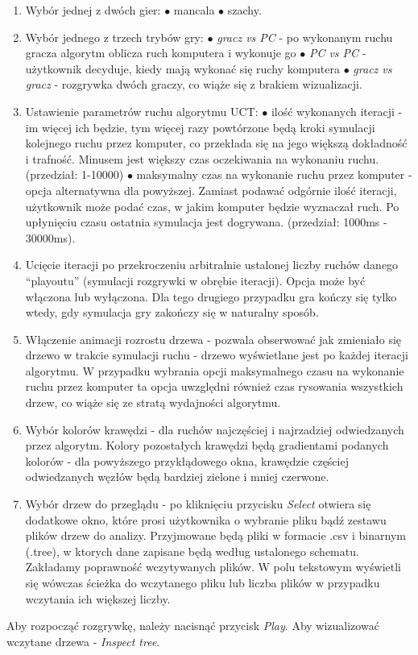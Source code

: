 \documentclass{article}
\begin{document}
\begin{enumerate}
	\item Wybór jednej z dwóch gier:
	\subitem $\bullet$ mancala
	\subitem $\bullet$ szachy.\\
	\item Wybór jednego z trzech trybów gry:
	\subitem $\bullet$ \textit{gracz vs PC} - po wykonanym ruchu gracza algorytm oblicza ruch komputera i wykonuje go
	\subitem $\bullet$ \textit{PC vs PC }- użytkownik decyduje, kiedy mają wykonać się ruchy komputera
	\subitem $\bullet$ \textit{gracz vs gracz} - rozgrywka dwóch graczy, co wiąże się z brakiem wizualizacji.\\
	\item Ustawienie parametrów ruchu algorytmu UCT:
	\subitem $\bullet$ ilość wykonanych iteracji - im więcej ich będzie, tym więcej razy powtórzone będą kroki symulacji kolejnego ruchu przez komputer, co przekłada się na jego większą dokładność i trafność. Minusem jest większy czas oczekiwania na wykonaniu ruchu. (przedział: 1-10000)
	\subitem $\bullet$ maksymalny czas na wykonanie ruchu przez komputer - opcja alternatywna dla powyższej. Zamiast podawać odgórnie ilość iteracji, użytkownik może podać czas, w jakim komputer będzie wyznaczał ruch. Po upłynięciu czasu ostatnia symulacja jest dogrywana. (przedział: 1000ms - 30000ms).\\
	\item Ucięcie iteracji po przekroczeniu arbitralnie ustalonej liczby ruchów danego ``playoutu'' (symulacji rozgrywki w obrębie iteracji). Opcja może być włączona lub wyłączona. Dla tego drugiego przypadku gra kończy się tylko wtedy, gdy symulacja gry zakończy się w naturalny sposób.\\
	\item Włączenie animacji rozrostu drzewa - pozwala obserwować jak zmieniało się drzewo w trakcie symulacji ruchu - drzewo wyświetlane jest po każdej iteracji algorytmu. W przypadku wybrania opcji maksymalnego czasu na wykonanie ruchu przez komputer ta opcja uwzględni również czas rysowania wszystkich drzew, co wiąże się ze stratą wydajności algorytmu.\\
	\item Wybór kolorów krawędzi - dla ruchów najczęściej i najrzadziej odwiedzanych przez algorytm. Kolory pozostałych krawędzi będą gradientami podanych kolorów - dla powyższego przykłądowego okna, krawędzie częściej odwiedzanych węzłów będą bardziej zielone i mniej czerwone.\\
	\item Wybór drzew do przeglądu - po kliknięciu przycisku \textit{Select} otwiera się dodatkowe okno, które prosi użytkownika o wybranie pliku bądź zestawu plików drzew do analizy. Przyjmowane będą pliki w formacie .csv i binarnym (.tree), w ktorych dane zapisane będą według ustalonego schematu. Zakładamy poprawność wczytywanych plików. W polu tekstowym wyświetli się wówczas ścieżka do wczytanego pliku lub liczba plików w przypadku wczytania ich większej liczby.\\
\end{enumerate}
Aby rozpocząć rozgrywkę, należy nacisnąć przycisk \textit{Play}. Aby wizualizować wczytane drzewa - \textit{Inspect tree}.
\end{document}
